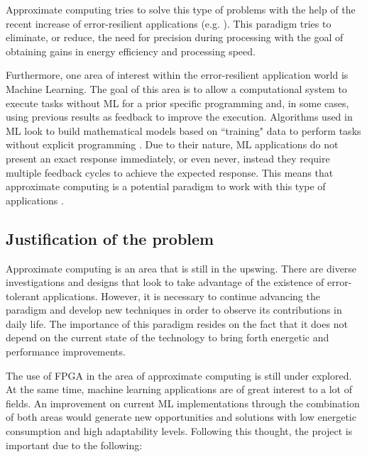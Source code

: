 Approximate computing tries to solve this type of problems with the help of the recent increase of error-resilient
applications (e.g. \cite{errortolerant}). This paradigm tries to eliminate, or reduce, the need for precision
during processing with the goal of obtaining gains in energy efficiency and processing speed.

Furthermore, one area of interest within the error-resilient application world is Machine Learning.
The goal of this area is to allow a computational system to execute tasks without ML for a prior
specific programming and, in some cases, using previous results as feedback to improve the execution.
Algorithms used in ML look to build mathematical models based on ``training" data to perform
tasks without explicit programming \cite{patternrecogbook}. Due to their nature, ML applications do not present
an exact response immediately, or even never, instead they require multiple feedback cycles to achieve
the expected response. This means that approximate computing is a potential paradigm to work with this
type of applications \cite{approximatecomp}.

\subsection{Justification of the problem}

Approximate computing is an area that is still in the upswing. There are diverse investigations and designs
that look to take advantage of the existence of error-tolerant applications. However, it is necessary to
continue advancing the paradigm and develop new techniques in order to observe its contributions in daily
life. The importance of this paradigm resides on the fact that it does not depend on the current state
of the technology to bring forth energetic and performance improvements.

The use of FPGA in the area of approximate computing is still under explored. At the same time, machine
learning applications are of great interest to a lot of fields. An improvement on current ML
implementations through the combination of both areas would generate new opportunities and solutions
with low energetic consumption and high adaptability levels. Following this thought, the project is
important due to the following:


